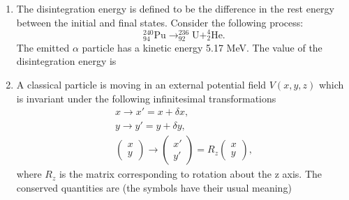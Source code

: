 \documentclass[14pt, a4paper]{extarticle}
\begin{document}
\begin{enumerate}[label=\textbf{Q. \arabic*}, start=21]
\item The disintegration energy is defined to be the difference in the rest energy between the initial and final states. Consider the following process:
\[ ^{240}_{94}\text{Pu} \rightarrow ^{236}_{92}\text{U} + ^{4}_{2}\text{He}. \]
The emitted $\alpha$ particle has a kinetic energy 5.17 MeV. The value of the disintegration energy is
\begin{enumerate}[label=(\Alph*)]
\end{enumerate}

\item A classical particle is moving in an external potential field $V(x,y,z)$ which is invariant under the following infinitesimal transformations
\begin{gather*}
x \rightarrow x' = x + \delta x, \\
y \rightarrow y' = y + \delta y, \\
\begin{pmatrix} x \\ y \end{pmatrix} \rightarrow \begin{pmatrix} x' \\ y' \end{pmatrix} = R_z \begin{pmatrix} x \\ y \end{pmatrix},
\end{gather*}
where $R_z$ is the matrix corresponding to rotation about the z axis. The conserved quantities are (the symbols have their usual meaning)
\begin{enumerate}[label=(\Alph*)]
\end{enumerate}


\end{enumerate}
\end{document}
